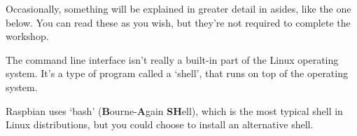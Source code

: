 Occasionally, something will be explained in greater detail in asides, like the one below. You can read these as you wish, but they're not required to complete the workshop.
	
\begin{aside}
	The command line interface isn't really a built-in part of the Linux operating system. It's a type of program called a `shell', that runs on top of the operating system.
	
	Raspbian uses `bash' (\textbf{B}ourne-\textbf{A}gain \textbf{SH}ell), which is the most typical shell in Linux distributions, but you could choose to install an alternative shell.
\end{aside}